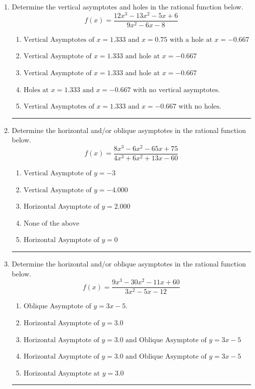 \documentclass[14pt]{extbook}
\newcommand{\litem}[1]{\item#1\hspace*{-1cm}\rule{\textwidth}{0.4pt}}
\begin{document}
\begin{enumerate}
{\begin{enumerate}[label=\Alph*.]
\end{enumerate} }
\litem{
Determine the vertical asymptotes and holes in the rational function below.\[ f(x) = \frac{12x^{3} -13 x^{2} -5 x + 6}{9x^{2} -6 x -8} \]\begin{enumerate}[label=\Alph*.]
\item \( \text{Vertical Asymptotes of } x = 1.333 \text{ and } x = 0.75 \text{ with a hole at } x = -0.667 \)
\item \( \text{Vertical Asymptote of } x = 1.333 \text{ and hole at } x = -0.667 \)
\item \( \text{Vertical Asymptote of } x = 1.333 \text{ and hole at } x = -0.667 \)
\item \( \text{Holes at } x = 1.333 \text{ and } x = -0.667 \text{ with no vertical asymptotes.} \)
\item \( \text{Vertical Asymptotes of } x = 1.333 \text{ and } x = -0.667 \text{ with no holes.} \)

\end{enumerate} }
\litem{
Determine the horizontal and/or oblique asymptotes in the rational function below.\[ f(x) = \frac{8x^{3} -6 x^{2} -65 x + 75}{4x^{3} +6 x^{2} +13 x -60} \]\begin{enumerate}[label=\Alph*.]
\item \( \text{Vertical Asymptote of } y = -3  \)
\item \( \text{Vertical Asymptote of } y = -4.000  \)
\item \( \text{Horizontal Asymptote of } y = 2.000  \)
\item \( \text{None of the above} \)
\item \( \text{Horizontal Asymptote of } y = 0  \)

\end{enumerate} }
\litem{
Determine the horizontal and/or oblique asymptotes in the rational function below.\[ f(x) = \frac{9x^{3} -30 x^{2} -11 x + 60}{3x^{2} -5 x -12} \]\begin{enumerate}[label=\Alph*.]
\item \( \text{Oblique Asymptote of } y = 3x -5. \)
\item \( \text{Horizontal Asymptote of } y = 3.0  \)
\item \( \text{Horizontal Asymptote of } y = 3.0 \text{ and Oblique Asymptote of } y = 3x -5 \)
\item \( \text{Horizontal Asymptote of } y = 3.0 \text{ and Oblique Asymptote of } y = 3x -5 \)
\item \( \text{Horizontal Asymptote at } y = 3.0 \)


\end{enumerate}}
\end{enumerate}
\end{document}
